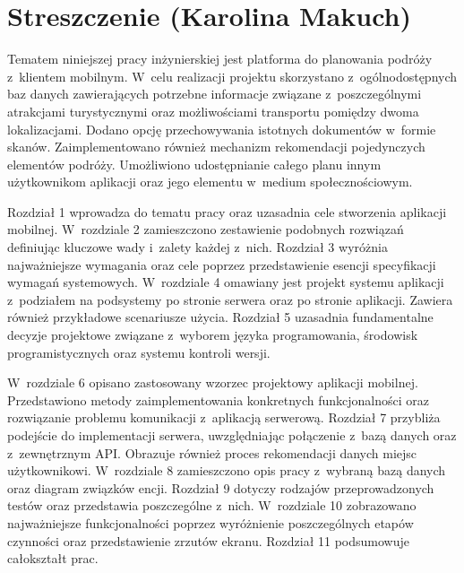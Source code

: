 \chapter*{Streszczenie (Karolina Makuch)}
 \par Tematem niniejszej pracy inżynierskiej jest platforma do planowania podróży z~klientem mobilnym. W~celu realizacji projektu skorzystano z~ogólnodostępnych baz danych zawierających potrzebne informacje związane z~poszczególnymi atrakcjami turystycznymi oraz możliwościami transportu pomiędzy dwoma lokalizacjami. Dodano opcję przechowywania istotnych dokumentów w~formie skanów. Zaimplementowano również mechanizm rekomendacji pojedynczych elementów podróży. Umożliwiono udostępnianie całego planu innym użytkownikom aplikacji oraz jego elementu w~medium społecznościowym.
 
 \par Rozdział 1 wprowadza do tematu pracy  oraz uzasadnia cele stworzenia aplikacji mobilnej. W~rozdziale 2 zamieszczono zestawienie podobnych rozwiązań definiując kluczowe wady i~zalety każdej z~nich. Rozdział 3 wyróżnia najważniejsze wymagania oraz cele poprzez przedstawienie esencji specyfikacji wymagań systemowych. W~rozdziale 4 omawiany jest projekt systemu aplikacji z~podziałem na podsystemy po stronie serwera oraz po stronie aplikacji. Zawiera również przykładowe scenariusze użycia. Rozdział 5 uzasadnia fundamentalne decyzje projektowe związane z~wyborem języka programowania, środowisk programistycznych oraz systemu kontroli wersji.

\par W~rozdziale 6 opisano zastosowany wzorzec projektowy aplikacji mobilnej. Przedstawiono metody zaimplementowania konkretnych funkcjonalności oraz rozwiązanie problemu komunikacji z~aplikacją serwerową. Rozdział 7 przybliża podejście do implementacji serwera, uwzględniając połączenie z~bazą danych oraz z~zewnętrznym API. Obrazuje również proces rekomendacji danych miejsc użytkownikowi.
W~rozdziale 8 zamieszczono opis pracy z~wybraną bazą danych oraz diagram związków encji.
Rozdział 9 dotyczy rodzajów przeprowadzonych testów oraz przedstawia poszczególne z~nich.
W~rozdziale 10 zobrazowano najważniejsze funkcjonalności poprzez wyróżnienie poszczególnych etapów czynności oraz przedstawienie zrzutów ekranu. 
Rozdział 11 podsumowuje całokształt prac.

